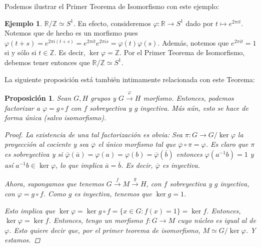 \documentclass[12pt]{book}
\newtheorem{prop}[teo]{Proposición}
\theoremstyle{definition}
\newtheorem{ex}[teo]{Ejemplo}
\newcommand{\RR}{\mathbb{R}}      %
\newcommand{\ZZ}{\mathbb{Z}}      %
\begin{document}
Podemos ilustrar el Primer Teorema de Isomorfismo con este ejemplo:

\begin{ex}
$\RR/\ZZ \simeq S^1$. En efecto, consideremos $\varphi:\RR \to S^1$ dado por $t\mapsto e^{2\pi i t}$. Notemos que de hecho es un morfismo pues $\varphi(t+s) = e^{2\pi i (t+s)} = e^{2\pi i t}e^{2\pi i s} = \varphi(t)\varphi(s)$. Además, notemos que $e^{2\pi i t} = 1$ si y sólo si $t\in \ZZ$. Es decir, $\ker \varphi = \ZZ$. Por el Primer Teorema de Isomorfismo, debemos tener entonces que $\RR/\ZZ\simeq S^1$.
\end{ex}

La siguiente proposición está también intimamente relacionada con este Teorema:

\begin{prop}
Sean $G,H$ grupos y $G\stackrel{\varphi}{\longrightarrow}H$ morfismo. Entonces, podemos factorizar a $\varphi = g\circ f$ con $f$ sobreyectiva y $g$ inyectiva. Más aún, esto se hace de forma única (salvo isomorfismo).
\begin{proof}

La existencia de una tal factorización es obvia: Sea $\pi : G\to G/\ker \varphi$ la proyección al cociente y sea $\overline{\varphi}$ el único morfismo tal que $\overline{\varphi}\circ \pi = \varphi$. Es claro que $\pi$ es sobreyectiva y si $\overline{\varphi}(\overline{a}) = \varphi(a) = \varphi(b) = \overline{\varphi}(\overline{b})$ entonces $\varphi(a^{-1}b)=1$ y así $a^{-1}b\in \ker\varphi$, lo que implica $\overline{a}=\overline{b}$. Es decir, $\overline{\varphi}$ es inyectiva.

\begin{center}
\end{center}


Ahora, supongamos que tenemos $G\stackrel{f}{\longrightarrow} M \stackrel{g}{\longrightarrow}H$, con $f$ sobreyectiva y $g$ inyectiva, con $\varphi = g\circ f$. Como $g$ es inyectiva, tenemos que $\ker g = 1$. 

Esto implica que $\ker \varphi = \ker g\circ f = \{x\in G : f(x) = 1\} = \ker f$. Entonces, $\ker \varphi = \ker f$. Entonces, tengo un morfismo $f:G\to M$ cuyo núcleo es igual al de $\varphi$. Esto quiere decir que, por el primer teorema de isomorfismo, $M\simeq G/\ker\varphi$. Y estamos.

\end{proof}
\end{prop}
\end{document}
